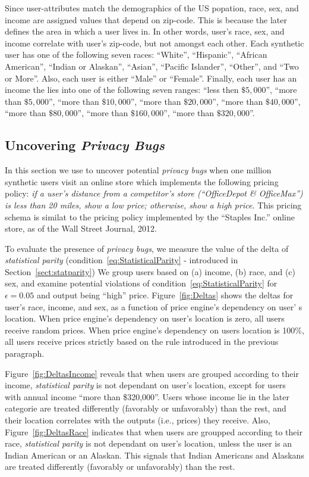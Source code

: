 Since user-attributes match the demographics of the US popation,
race, sex, and income are assigned values that depend on zip-code. This is
because
the later defines the area in which a user lives in. In other words, user's race,
sex, and income correlate with user's zip-code, but not amongst each other.
Each synthetic user has
one of the following seven races: ``White'', ``Hispanic'', ``African
American'', ``Indian or Alaskan'', ``Asian'', ``Pacific Islander'', ``Other'',
and ``Two or More''. Also, each user is either ``Male'' or ``Female''. Finally,
each user has an income the lies into one of the following seven ranges:
``less then $\$5,000$'', ``more than $\$5,000$'', ``more than $\$10,000$'',
``more than $\$20,000$'', ``more than $\$40,000$'', ``more than $\$80,000$'',
``more than $\$160,000$'', ``more than $\$320,000$''.

\subsection{\normalsize Uncovering {\em Privacy Bugs}}
\label{sect:uncovering}
In this section we use \sysname to uncover potential {\em privacy bugs}
when one million synthetic users visit an online store which
implements the following pricing policy:
{\it if a user's distance from a competitor's store
(``OfficeDepot \& OfficeMax'') is less than 20 miles, show a low price;
otherwise, show a high price.} This pricing schema is similat to the pricing
policy implemented by the ``Staples Inc.'' online store, as of the Wall Street
Journal, 2012.

To evaluate the presence of {\em privacy bugs}, we measure the
value of the delta of {\em statistical parity}
(condition~\ref{eq:StatisticalParity} -
introduced in Section~\ref{sect:statparity})
We group users based on (a) income, (b) race, and (c) sex, and examine potential
violations of condition~\ref{eq:StatisticalParity} for $\epsilon=0.05$ and
output being ``high'' price. Figure~\ref{fig:Deltas} shows the deltas
for user's race, income, and sex, as a function of price engine's dependency
on user' s location. When price engine's dependency on user's location is zero,
all users receive random prices. When price engine's dependency on users
location is 100\%, all users receive prices strictly based on the rule
introduced in the previous paragraph.


Figure~\ref{fig:DeltasIncome} reveals that when users are grouped according to
their income, {\em statistical parity} is not dependant on user's location,
except for users with annual income ``more than \$320,000''. Users whose income
lie in the later categorie are treated differently (favorably or unfavorably)
than the rest, and their location correlates with the outputs (i.e., prices)
they receive. Also, Figure~\ref{fig:DeltasRace} indicates that when users are
groupped according to their race, {\em statistical parity} is not dependant on
user's location, unless the user is an Indian American or an Alaskan.
This signals that Indian Americans and Alaskans are treated differently
(favorably or unfavorably) than the rest.

